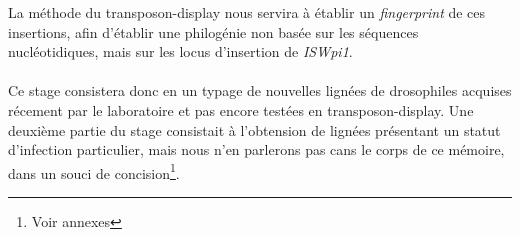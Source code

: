 La méthode du transposon-display nous servira à établir un \textit{fingerprint} de ces insertions, afin d’établir une philogénie non basée sur les séquences nucléotidiques, mais sur les locus d’insertion de \textit{ISWpi1}.

\paragraph{} %
\label{par:Sujet}
Ce stage consistera donc en un typage de nouvelles lignées de drosophiles acquises récement par le laboratoire et pas encore testées en transposon-display. Une deuxième partie du stage consistait à l’obtension de lignées  présentant un statut d'infection particulier, mais nous n'en parlerons pas cans le corps de ce mémoire, dans un souci de concision\footnote{Voir annexes}.
